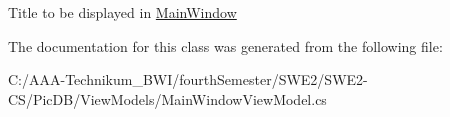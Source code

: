 Title to be displayed in \mbox{\hyperlink{class_pic_d_b_1_1_main_window}{Main\+Window}} 



The documentation for this class was generated from the following file\+:\begin{DoxyCompactItemize}
\item 
C\+:/\+A\+A\+A-\/\+Technikum\+\_\+\+B\+W\+I/fourth\+Semester/\+S\+W\+E2/\+S\+W\+E2-\/\+C\+S/\+Pic\+D\+B/\+View\+Models/Main\+Window\+View\+Model.\+cs\end{DoxyCompactItemize}
